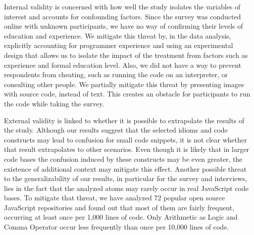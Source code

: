 

Internal validity is concerned with how well the study isolates the variables of interest and accounts for confounding factors. Since the survey was conducted online with unknown participants, we have no way of confirming their levels of education and experience. We mitigate this threat by, in the data analysis, explicitly accounting for programmer experience and using an experimental design that allows us to isolate the impact of the treatment from factors such as experience and formal education level. Also, we did not have a way to prevent respondents from cheating, such as running the code on an interpreter, or consulting other people. We partially mitigate this threat by presenting images with source code, instead of text. This creates an obstacle for participants to run the code while taking the survey.

External validity is linked to whether it is possible to extrapolate the results of the study. Although our results suggest that the selected idioms and code constructs may lead to confusion for small code snippets, it is not clear whether that result extrapolates to other scenarios. Even though it is likely that in larger code bases the confusion induced by these constructs may be even greater, the existence of additional context may mitigate this effect. Another possible threat to the generalizability of our results, in particular for the survey and interviews, lies in the fact that the analyzed atoms may rarely occur in real JavaScript code bases. To mitigate that threat, we have analyzed 72 popular open source JavaScript repositories and found out that most of them are fairly frequent, occurring at least once per 1,000 lines of code. Only Arithmetic as Logic and Comma Operator occur less frequently than once per 10,000 lines of code. 



